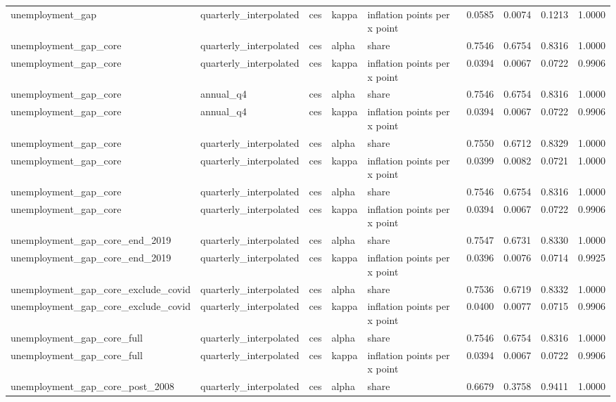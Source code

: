 \begin{tabular}{lllllrrrr}
unemployment\_gap & quarterly\_interpolated & ces & kappa & inflation points per x point & 0.0585 & 0.0074 & 0.1213 & 1.0000 \\
unemployment\_gap\_core & quarterly\_interpolated & ces & alpha & share & 0.7546 & 0.6754 & 0.8316 & 1.0000 \\
unemployment\_gap\_core & quarterly\_interpolated & ces & kappa & inflation points per x point & 0.0394 & 0.0067 & 0.0722 & 0.9906 \\
unemployment\_gap\_core & annual\_q4 & ces & alpha & share & 0.7546 & 0.6754 & 0.8316 & 1.0000 \\
unemployment\_gap\_core & annual\_q4 & ces & kappa & inflation points per x point & 0.0394 & 0.0067 & 0.0722 & 0.9906 \\
unemployment\_gap\_core & quarterly\_interpolated & ces & alpha & share & 0.7550 & 0.6712 & 0.8329 & 1.0000 \\
unemployment\_gap\_core & quarterly\_interpolated & ces & kappa & inflation points per x point & 0.0399 & 0.0082 & 0.0721 & 1.0000 \\
unemployment\_gap\_core & quarterly\_interpolated & ces & alpha & share & 0.7546 & 0.6754 & 0.8316 & 1.0000 \\
unemployment\_gap\_core & quarterly\_interpolated & ces & kappa & inflation points per x point & 0.0394 & 0.0067 & 0.0722 & 0.9906 \\
unemployment\_gap\_core\_end\_2019 & quarterly\_interpolated & ces & alpha & share & 0.7547 & 0.6731 & 0.8330 & 1.0000 \\
unemployment\_gap\_core\_end\_2019 & quarterly\_interpolated & ces & kappa & inflation points per x point & 0.0396 & 0.0076 & 0.0714 & 0.9925 \\
unemployment\_gap\_core\_exclude\_covid & quarterly\_interpolated & ces & alpha & share & 0.7536 & 0.6719 & 0.8332 & 1.0000 \\
unemployment\_gap\_core\_exclude\_covid & quarterly\_interpolated & ces & kappa & inflation points per x point & 0.0400 & 0.0077 & 0.0715 & 0.9906 \\
unemployment\_gap\_core\_full & quarterly\_interpolated & ces & alpha & share & 0.7546 & 0.6754 & 0.8316 & 1.0000 \\
unemployment\_gap\_core\_full & quarterly\_interpolated & ces & kappa & inflation points per x point & 0.0394 & 0.0067 & 0.0722 & 0.9906 \\
unemployment\_gap\_core\_post\_2008 & quarterly\_interpolated & ces & alpha & share & 0.6679 & 0.3758 & 0.9411 & 1.0000 \\

\end{tabular}
